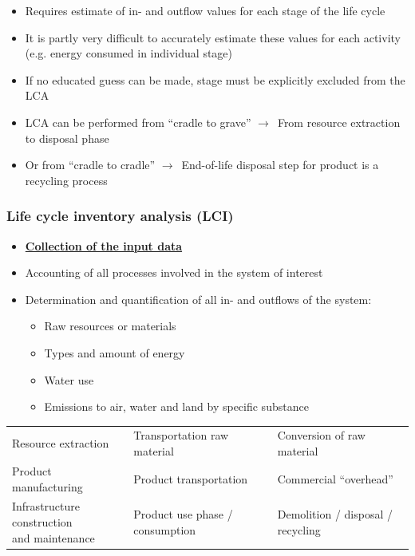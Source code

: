 \documentclass{article}
\begin{document}
\vspace*{-.4cm}
\begin{itemize}
    \item Requires estimate of in- and outflow values for each stage of the life cycle
    \item It is partly very difficult to accurately estimate these values for each activity (e.g. energy consumed in individual stage)
    \item If no educated guess can be made, stage must be explicitly excluded from the LCA
    \item LCA can be performed from ``cradle to grave'' $\to$\ From resource extraction to disposal phase
    \item Or from ``cradle to cradle'' $\to$\ End-of-life disposal step for product is a recycling process
\end{itemize}

\subsubsection{Life cycle inventory analysis (LCI)}
\begin{itemize}
    \item \underline{\textbf{Collection of the input data}}
    \item Accounting of all processes involved in the system of interest
    \item Determination and quantification of all in- and outflows of the system:
    \begin{itemize}[label=$\to$]
        \item Raw resources or materials
        \item Types and amount of energy
        \item Water use
        \item Emissions to air, water and land by specific substance
    \end{itemize}
\end{itemize}

\begin{table}[ht!]
    \renewcommand{\baselinestretch}{1.5}\selectfont
    \begin{tabular}{lll}
        Resource extraction & Transportation raw material & Conversion of raw material\\
        Product manufacturing & Product transportation & Commercial ``overhead''\\
        \makecell[l]{Infrastructure construction\\[-1ex] and maintenance} & Product use phase / consumption & Demolition / disposal / recycling\\
    \end{tabular}
\end{table}
\end{document}
